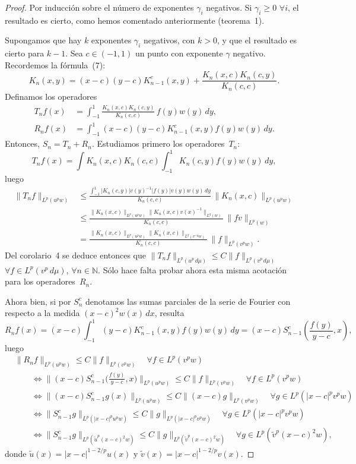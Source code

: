 \documentclass[a4paper,12pt]{article}
\theoremstyle{plain}
\theoremstyle{definition}
\newcommand{\N}{\mathbb{N}}
\begin{document}
\begin{proof}
Por inducci\'on sobre el n\'umero de exponentes $\gamma_{i}$ negativos.
Si $\gamma_{i} \geq 0$ $\forall i$, el resultado es cierto,
como hemos comentado anteriormente (teorema~1).

Supongamos que hay $k$ exponentes $\gamma_{i}$ negativos,
con $k > 0$, y que el resultado es cierto para $k-1$. Sea $c \in (-1,1)$
un punto con exponente $\gamma$ negativo.
Recordemos la f\'ormula~(7):
$$
K_{n}(x,y) = (x-c) (y-c) K_{n-1}^{c}(x,y)
+ \frac{K_{n}(x,c) K_{n}(c,y)}{K_{n}(c,c)}.
$$
Definamos los operadores
\begin{align*}
T_{n}f(x) &= \int_{-1}^{1}
\frac{K_{n}(x,c) K_{n}(c,y)}{K_{n}(c,c)}\, f(y) w(y)\,dy,\\
R_{n}f(x) &= \int_{-1}^{1}
(x-c) (y-c) K_{n-1}^{c}(x,y) f(y) w(y)\,dy.
\end{align*}
Entonces, $S_{n} = T_{n} + R_{n}$. Estudiamos primero
los operadores~$T_{n}$:
$$
T_{n}f(x) = \int{K_{n}(x,c)}{K_{n}(c,c)}
\int_{-1}^{1} K_{n}(c,y) f(y) w(y)\,dy,
$$
luego
\begin{align*}
\| T_{n}f \|_{L^{p}(u^{p}w)}
&\leq \frac{\int_{-1}^{1}  | K_{n}(c,y) | v(y)^{-1} | f(y) | v(y) w(y) \,dy}
{K_{n}(c,c)}\, \| K_{n}(x,c) \|_{L^{p}(u^{p}w)} \\
&\leq \frac{\| K_{n}(x,c) \|_{L^{p}(u^{p}w)}
\| K_{n}(x,c) v(x)^{-1} \|_{L^{q}(w)}}{K_{n}(c,c)}\,
\| f v \|_{L^{p}(w)} \\
&= \frac{\| K_{n}(x,c) \|_{L^{p}(u^{p}w)}
\| K_{n}(x,c) \|_{L^{q}(v^{-q}w)}}{K_{n}(c,c)}\,
\| f \|_{L^{p}(v^{p}w)}.
\end{align*}
Del corolario~4 se deduce entonces que $\| T_{n}f \|_{L^{p}(u^{p}\,d\mu)}
\leq C \| f \|_{L^{p}(v^{p}\,d\mu)}$
$\forall f \in L^{p}(v^{p}\,d\mu)$,
$\forall n \in \N$. S\'olo hace falta probar ahora esta misma
acotaci\'on para los operadores~$R_{n}$.

Ahora bien, si por $S_{n}^{c}$ denotamos las sumas parciales
de la serie de Fourier con respecto a la medida $(x-c)^{2}w(x)\,dx$,
resulta
$$
R_{n}f(x) = (x-c) \int_{-1}^{1} (y-c) K_{n-1}^{c}(x,y) f(y) w(y)\,dy
= (x-c) S_{n-1}^{c} \left(\frac{f(y)}{y-c}, x \right),
$$
luego
\begin{align*}
&\| R_{n}f \|_{L^{p}(u^{p}w)} \leq C \| f \|_{L^{p}(v^{p}w)}
\quad\forall f \in L^{p}(v^{p}w) \\
&\qquad\iff
\big\| (x-c) S_{n-1}^{c} \big(\tfrac{f(y)}{y-c}, x \big) \big\|_{L^{p}(u^{p}w)}
\leq C \| f \|_{L^{p}(v^{p}w)}
\quad\forall f \in L^{p}(v^{p}w) \\
&\qquad\iff
\| (x-c) S_{n-1}^{c}g (x) \|_{L^{p}(u^{p}w)}
\leq C \| (x-c) g \|_{L^{p}(v^{p}w)}
\quad\forall g \in L^{p}(|x-c|^{p} v^{p}w) \\
&\qquad\iff
\| S_{n-1}^{c}g \|_{L^{p}(|x-c|^{p}u^{p}w)}
\leq C \| g \|_{L^{p}(|x-c|^{p}v^{p}w)}
\quad\forall g \in L^{p}(|x-c|^{p} v^{p}w) \\
&\qquad\iff
\| S_{n-1}^{c}g \|_{L^{p}({\tilde{u}}^{p}(x-c)^{2}w)}
\leq C \| g \|_{L^{p}({\tilde{v}}^{p}(x-c)^{2}w)}
\quad\forall g \in L^{p}({\tilde{v}}^{p}(x-c)^{2}w),
\end{align*}
donde $\tilde{u}(x) = | x - c |^{1-2/p} u(x)$
y $\tilde{v}(x) = | x - c |^{1-2/p} v(x)$.


\end{proof}
\end{document}
